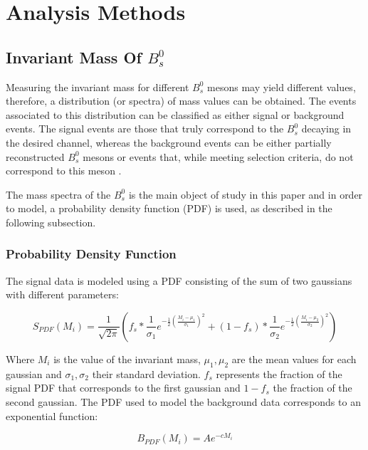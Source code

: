 \chapter[\leavevmode\newline Analysis Methods]{Analysis Methods}
\label{chap:Chapter_4}
\section{Invariant Mass Of $B^0_s$}
Measuring the invariant mass for different $B^0_s$ mesons may yield different values, therefore, a distribution (or spectra) of mass values can be obtained. The events associated to this distribution can be classified as either signal or background events. The signal events are those that truly correspond to the $B^0_s$ decaying in the desired channel, whereas the background events can be either partially reconstructed $B^0_s$ mesons or events that, while meeting selection criteria, do not correspond to this meson \cite{mejia2012medida}.

The mass spectra of the $B^0_s$ is the main object of study in this paper and in order to model, a probability density function (PDF) is used, as described in the following subsection. 
\subsection{Probability Density Function}
The signal data is modeled using a PDF consisting of the sum of two gaussians with different parameters:

\begin{equation}
S_{PDF}(M_i) = \frac{1}{\sqrt{2\pi}} \left(f_s*\frac{1}{\sigma_1}e^{-\frac{1}{2}\left(\frac{M_i-\mu_1}{\sigma_1}\right)^2} + (1 - f_s)*\frac{1}{\sigma_2}e^{-\frac{1}{2}\left(\frac{M_i-\mu_2}{\sigma_2}\right)^2}\right)
\end{equation}

Where $M_i$ is the value of the invariant mass, $\mu_1, \mu_2$ are the mean values for each gaussian and $\sigma_1, \sigma_2$ their standard deviation. $f_s$ represents the fraction of the signal PDF that corresponds to the first gaussian and $1-f_s$ the fraction of the second gaussian. The PDF used to model the background data corresponds to an exponential function: %

\begin{equation}
B_{PDF}(M_i) = A e^{-cM_i}
\end{equation}

